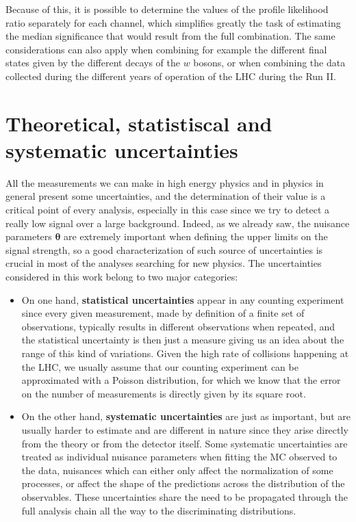 \documentclass[a4paper, 10pt, openright]{report}
\begin{document}
Because of this, it is possible to determine the values of the profile likelihood ratio separately for each channel, which simplifies greatly the task of estimating the median significance that would result from the full combination. The same considerations can also apply when combining for example the different final states given by the different decays of the $w$ bosons, or when combining the data collected during the different years of operation of the \ac{LHC} during the Run II.

\section{Theoretical, statistiscal and systematic uncertainties} \label{section:Systematics}

All the measurements we can make in high energy physics and in physics in general present some
uncertainties, and the determination of their value is a critical point of every analysis, especially in this case since we try to detect a really low signal over a large background. Indeed, as we already saw, the nuisance parameters $\bm \theta$ are extremely important when defining the upper limits on the signal strength, so a good characterization of such source of uncertainties is crucial in most of the analyses searching for new physics. The uncertainties considered in this work belong to two major categories:

\begin{itemize}
\item On one hand, \textbf{statistical uncertainties} appear in any counting experiment \cite {statistical} since every given measurement, made by definition of a finite set of observations, typically results in different observations when repeated, and the statistical uncertainty is then just a measure giving us an idea about the range of this kind of variations. Given the high rate of collisions happening at the \ac{LHC}, we usually assume that our counting experiment can be approximated with a Poisson distribution, for which we know that the error on the number of measurements is directly given by its square root.
\item On the other hand, \textbf{systematic uncertainties} are just as important, but are usually harder to estimate and are different in nature \cite{systematics} since they arise directly from the theory or from the detector itself. Some systematic uncertainties are treated as individual nuisance parameters when fitting the \ac{MC} observed to the data, nuisances which can either only affect the normalization of some processes, or affect the shape of the predictions across the distribution of the observables. These uncertainties share the need to be propagated through the full analysis chain all the way to the discriminating distributions.
\end{itemize}
\end{document}
